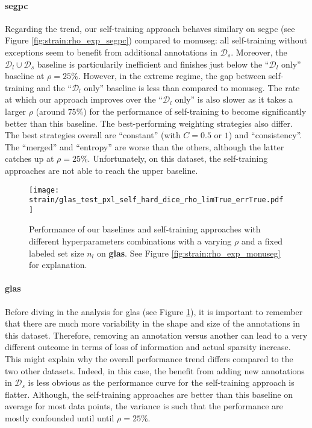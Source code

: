 \paragraph{\acrshort{segpc}} Regarding the trend, our self-training approach behaves similary on \acrshort{segpc} (see Figure \ref{fig:strain:rho_exp_segpc}) compared to \acrshort{monuseg}: all self-training without exceptions seem to benefit from additional annotations in $\mathcal{D}_s$. Moreover, the $\mathcal{D}_l \cup \mathcal{D}_s$ baseline is particularily inefficient and finishes just below the ``$\mathcal{D}_l$ only'' baseline at $\rho = 25\%$. However, in the extreme regime, the gap between self-training and the ``$\mathcal{D}_l$ only'' baseline is less than compared to \acrshort{monuseg}. The rate at which our approach improves over the ``$\mathcal{D}_l$ only'' is also slower as it takes a larger $\rho$ (around $75\%$) for the performance of self-training to become significantly better than this baseline. The best-performing weighting strategies also differ. The best strategies overall are ``constant'' (with $C = 0.5$ or $1$) and ``consistency''. The ``merged'' and ``entropy'' are worse than the others, although the latter catches up at $\rho = 25\%$. Unfortunately, on this dataset, the self-training approaches are not able to reach the upper baseline. 

\begin{figure}
  \centering
  \texttt{[image: strain/glas\_test\_pxl\_self\_hard\_dice\_rho\_limTrue\_errTrue.pdf]}
  \caption{Performance of our baselines and self-training approaches with different hyperparameters combinations with a varying $\rho$ and a fixed labeled set size $n_l$ on \textbf{\acrshort{glas}}. See Figure \ref{fig:strain:rho_exp_monuseg} for explanation.}
  \label{fig:strain:rho_exp_glas}
\end{figure}

\paragraph{\acrshort{glas}} Before diving in the analysis for \acrshort{glas} (see Figure \ref{fig:strain:rho_exp_glas}), it is important to remember that there are much more variability in the shape and size of the annotations in this dataset. Therefore, removing an annotation versus another can lead to a very different outcome in terms of loss of information and actual sparsity increase. This might explain why the overall performance trend differs compared to the two other datasets. Indeed, in this case, the benefit from adding new annotations in $\mathcal{D}_s$ is less obvious as the performance curve for the self-training approach is flatter. Although, the self-training approaches are better than this baseline on average for most data points, the variance is such that the performance are mostly confounded until until $\rho = 25\%$.

